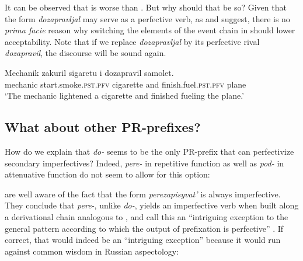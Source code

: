 \documentclass[output=paper,
colorlinks,
citecolor=brown,
newtxmath
]{langscibook}
\begin{document}
\z

\noindent It can be observed that  is worse than . But why should that be so? Given that the form \textit{dozapravljal} may serve as a perfective verb, as \citet{Zinova.Filip2015} and \citet{Zinova2016} suggest, there is no \textit{prima facie} reason why switching the elements of the event chain in  should lower acceptability. Note that if we replace \textit{dozapravljal} by its perfective rival \textit{dozapravil}, the discourse will be sound again.

\ea\label{machaplus}
\gll Mechanik zakuril sigaretu i dozapravil samolet.\\
mechanic {start.smoke.}\textsc{pst.pfv} cigarette and {finish.fuel.}\textsc{pst.pfv} plane\\
\glt `The mechanic lightened a cigarette and finished fueling the plane.'
\z


\subsection{What about other PR-prefixes?}\label{popopo}

How do we explain that \textit{do-} seems to be the only PR-prefix that can perfectivize secondary imperfectives? Indeed, \textit{pere-} in repetitive function as well as \textit{pod-} in attenuative function do not seem to allow for this option:

\z

\z

\noindent \citet{Zinova.Filip2015} are well aware of the fact that the form \textit{perezapisyvat'} is always imperfective. They conclude that \textit{pere-}, unlike \textit{do-}, yields an imperfective verb when built along a derivational chain analogous to , and call this an ``intriguing exception to the general pattern according to which the output of prefixation is perfective'' \citep[605]{Zinova.Filip2015}. If correct, that would indeed be an ``intriguing exception'' because it would run against common wisdom in Russian aspectology:
\end{document}
